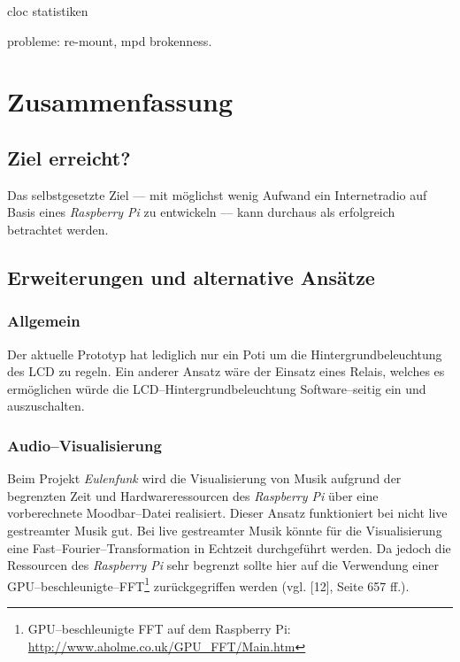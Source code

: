 \documentclass[11pt,ngerman,toc=listof,index=totoc]{scrreprt}
\begin{document}
cloc statistiken

probleme: re-mount, mpd brokenness.

\chapter{Zusammenfassung}\label{zusammenfassung}

\section{Ziel erreicht?}\label{ziel-erreicht}

Das selbstgesetzte Ziel --- mit möglichst wenig Aufwand ein
Internetradio auf Basis eines \emph{Raspberry Pi} zu entwickeln --- kann
durchaus als erfolgreich betrachtet werden.

\section{Erweiterungen und alternative
Ansätze}\label{erweiterungen-und-alternative-ansuxe4tze}

\subsection{Allgemein}\label{allgemein}

Der aktuelle Prototyp hat lediglich nur ein Poti um die
Hintergrundbeleuchtung des LCD zu regeln. Ein anderer Ansatz wäre der
Einsatz eines Relais, welches es ermöglichen würde die
LCD--Hintergrundbeleuchtung Software--seitig ein und auszuschalten.

\subsection{Audio--Visualisierung}\label{audiovisualisierung}

Beim Projekt \emph{Eulenfunk} wird die Visualisierung von Musik aufgrund
der begrenzten Zeit und Hardwareressourcen des \emph{Raspberry Pi }über
eine vorberechnete Moodbar--Datei realisiert. Dieser Ansatz funktioniert
bei nicht live gestreamter Musik gut. Bei live gestreamter Musik könnte
für die Visualisierung eine Fast--Fourier--Transformation in Echtzeit
durchgeführt werden. Da jedoch die Ressourcen des \emph{Raspberry Pi}
sehr begrenzt sollte hier auf die Verwendung einer
GPU--beschleunigte--FFT\footnote{GPU--beschleunigte FFT auf dem
  Raspberry Pi: \url{http://www.aholme.co.uk/GPU_FFT/Main.htm}}
zurückgegriffen werden (vgl. {[}12{]}, Seite 657 ff.).
\end{document}
